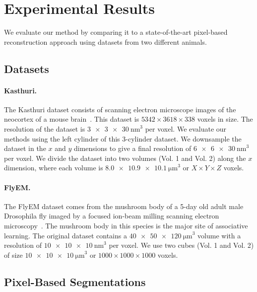 \section{Experimental Results}

We evaluate our method by comparing it to a state-of-the-art pixel-based reconstruction approach using datasets from two different animals.

\subsection{Datasets}
\label{sec:dataset}

\paragraph{Kasthuri.}
The Kasthuri dataset consists of scanning electron microscope images of the neocortex of a mouse brain~\cite{kasthuri2015saturated}. This dataset is $5342 \times 3618 \times 338$ voxels in size. The resolution of the dataset is $\SI[product-units=single]{3 x 3 x 30}{\nano\meter}^3$ per voxel. We evaluate our methods using the left cylinder of this 3-cylinder dataset. We downsample the dataset in the $x$ and $y$ dimensions to give a final resolution of $\SI[product-units=single]{6 x 6 x 30}{\nano\meter}^3$ per voxel. We divide the dataset into two volumes (Vol. 1 and Vol. 2) along the $x$ dimension, where each volume is $\SI[product-units=single]{8.0 x 10.9 x 10.1}{\micro\meter}^3$ or $X \times Y \times Z$ voxels. 

\paragraph{FlyEM.}
The FlyEM dataset comes from the mushroom body of a 5-day old adult male Drosophila fly imaged by a focused ion-beam milling scanning electron microscopy~\cite{takemura2017connectome}. The mushroom body in this species is the major site of associative learning. The original dataset contains a $\SI[product-units=single]{40 x 50 x 120}{\micro\meter}^3$ volume with a resolution of $\SI[product-units=single]{10 x 10 x 10}{\nano\meter}^3$ per voxel. We use two cubes (Vol. 1 and Vol. 2) of size $\SI[product-units=single]{10 x 10 x 10}{\micro\meter}^3$ or $1000 \times 1000 \times 1000$ voxels.

\subsection{Pixel-Based Segmentations}
\label{sec:neuroproof}

